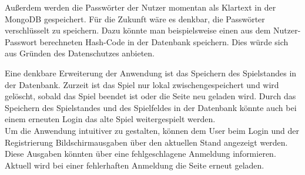 Außerdem werden die Passwörter der Nutzer momentan als Klartext in der MongoDB gespeichert. Für die Zukunft wäre es denkbar, die Passwörter verschlüsselt zu speichern. Dazu könnte man beispielsweise einen aus dem Nutzer-Passwort berechneten Hash-Code in der Datenbank speichern. Dies würde sich aus Gründen des Datenschutzes anbieten.

Eine denkbare Erweiterung der Anwendung ist das Speichern des Spielstandes in der Datenbank. Zurzeit ist das Spiel nur lokal zwischengespeichert und wird gelöscht, sobald das Spiel beendet ist oder die Seite neu geladen wird. Durch das Speichern des Spielstandes und des Spielfeldes in der Datenbank könnte auch bei einem erneuten Login das alte Spiel weitergespielt werden.\\
Um die Anwendung intuitiver zu gestalten, können dem User beim Login und der Registrierung Bildschirmausgaben über den aktuellen Stand angezeigt werden. Diese Ausgaben könnten über eine fehlgeschlagene Anmeldung informieren. Aktuell wird bei einer fehlerhaften Anmeldung die Seite erneut geladen. 